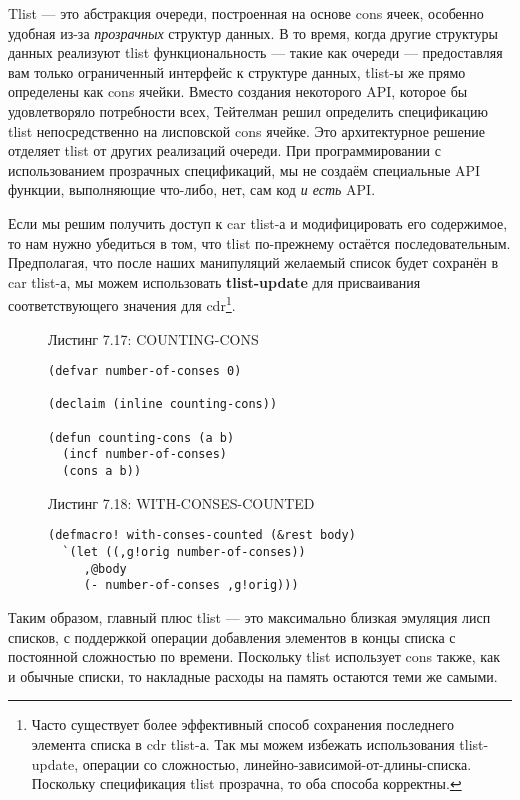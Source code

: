 Tlist --- это абстракция очереди, построенная на основе cons ячеек, особенно удобная из-за \emph{прозрачных} структур данных. В то время, когда другие структуры данных реализуют tlist функциональность --- такие как очереди --- предоставляя вам только ограниченный интерфейс к структуре данных, tlist-ы же прямо определены как cons ячейки. Вместо создания некоторого API, которое бы удовлетворяло потребности всех, Тейтелман решил определить спецификацию tlist непосредственно на лисповской cons ячейке. Это архитектурное решение отделяет tlist от других реализаций очереди. При программировании с использованием прозрачных спецификаций, мы не создаём специальные API функции, выполняющие что-либо, нет, сам код \emph{и есть} API.

Если мы решим получить доступ к car tlist-а и модифицировать его содержимое, то нам нужно убедиться в том, что tlist по-прежнему остаётся последовательным. Предполагая, что после наших манипуляций желаемый список будет сохранён в car tlist-а, мы можем использовать \textbf{tlist-update} для присваивания соответствующего значения для cdr\footnote{Часто существует более эффективный способ сохранения последнего элемента списка в cdr tlist-а. Так мы можем избежать использования tlist-update, операции со сложностью, линейно-зависимой-от-длины-списка. Поскольку спецификация tlist прозрачна, то оба способа корректны.}.

\begin{figure}Листинг 7.17: COUNTING-CONS\label{listing_7.17}
\listbegin
\begin{verbatim}
(defvar number-of-conses 0)

(declaim (inline counting-cons))

(defun counting-cons (a b)
  (incf number-of-conses)
  (cons a b))
\end{verbatim}
\listend
\end{figure}

\begin{figure}Листинг 7.18: WITH-CONSES-COUNTED\label{listing_7.18}
\listbegin
\begin{verbatim}
(defmacro! with-conses-counted (&rest body)
  `(let ((,g!orig number-of-conses))
     ,@body
     (- number-of-conses ,g!orig)))
\end{verbatim}
\listend
\end{figure}

Таким образом, главный плюс tlist --- это максимально близкая эмуляция лисп списков, с поддержкой операции добавления элементов в концы списка с постоянной сложностью по времени. Поскольку tlist использует cons также, как и обычные списки, то накладные расходы на память остаются теми же самыми.

